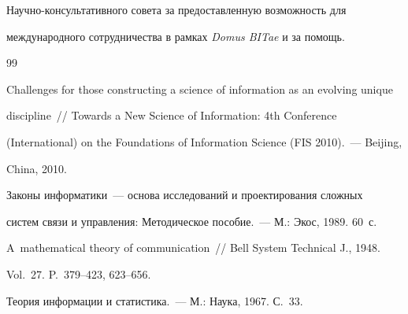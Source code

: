 Научно-кон\-суль\-та\-тив\-но\-го совета за предоставленную возможность для 


международного сотрудничества в рамках \textit{Domus BITae} и за помощь.





{\small\frenchspacing


{%




\begin{thebibliography}{99}









Challenges for those constructing a science of information as an evolving unique 


discipline~/\!\!/ Towards a New Science of Information: 4th Conference 


(International) on the Foundations of Information Science (FIS 2010).~--- Beijing, 


China, 2010.









Законы информатики~--- основа исследований и проектирования сложных 


систем связи и управления: Методическое пособие.~--- М.: Экос, 1989. 60~с.









A~mathematical theory of communication~/\!\!/ Bell System Technical J., 1948. 


Vol.~27. P.~379--423, 623--656.









Теория информации и статистика.~--- М.: Наука, 1967. С.~33.










\end{thebibliography}}}
